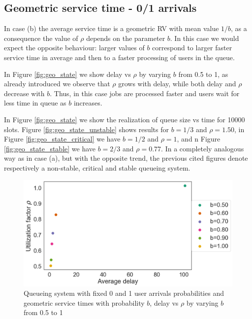 \documentclass[twoside,onecolumn]{article}
\theoremstyle{definition}
\begin{document}
\subsection{Geometric service time - 0/1 arrivals }
In case (b) the average service time is a geometric RV with mean value $1/b$, as a consequence the value of $\rho$ depends on the parameter $b$. In this case we would expect the opposite behaviour: larger values of $b$ correspond to larger faster service time in average and then to a faster processing of users in the queue.  

In Figure \ref{fig:geo_state} we show delay vs  $\rho$ by varying $b$ from 0.5 to 1, as already introduced we observe that $\rho$ grows with delay, while both delay and $\rho$ decrease with $b$. Thus, in this case jobs are processed faster and users wait for less time in queue as $b$ increases.
\par
In Figure \ref{fig:geo_state} we show the realization of queue size vs time for 10000 slots. Figure \ref{fig:geo_state_unstable} shows results for $b=1/3$ and $\rho = 1.50$, in Figure \ref{fig:geo_state_critical} we have $b=1/2$ and $\rho = 1$, and  n Figure \ref{fig:geo_state_stable} we have $b=2/3$ and $\rho = 0.77$. In a completely analogous way as in case (a), but with the opposite trend, the previous cited figures denote respectively a non-stable, critical and stable queueing system.

\begin{figure} \centering
         \includegraphics[width=0.7 \textwidth]{../single_server_queue/figures/delay_vs_rho_geometric.png}
    \caption{Queueing system with fixed 0 and 1 user arrivals probabilities and geometric service times with probability $b$, delay vs $\rho$ by varying $b$ from 0.5 to 1 }\label{fig:}
\end{figure}
\end{document}
